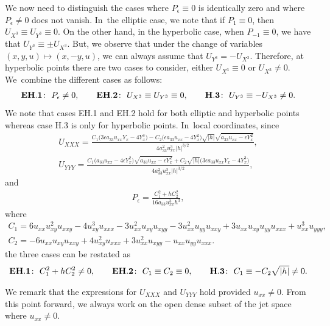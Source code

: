 \documentclass[10pt,a4paper]{amsart}
\numberwithin{equation}{section}
\begin{document}
We now need to distinguish the cases where $P_{\epsilon}\equiv 0$ is identically zero and where $P_{\epsilon}\neq 0$ does not vanish. In~the elliptic case, we note that if $P_1 \equiv 0$, then $U_{X^3}\equiv U_{Y^3}\equiv 0$. On the other hand, in the hyperbolic case, when $P_{-1} \equiv 0$, we have that $U_{Y^3} \equiv \pm U_{X^3}$. But, we observe that under the change of variables $(x,y,u)\mapsto (x,-y,u)$, we can always assume that $U_{Y^3}=-U_{X^3}$. Therefore, at hyperbolic points there are two cases to consider, either $U_{X^3} \equiv 0$ or $U_{X^3} \neq 0$. We~combine the different cases as follows:
\begin{gather*}
{\bf EH.1}\colon\ P_\epsilon \neq 0,\qquad
{\bf EH.2}\colon\ U_{X^3}\equiv U_{Y^3} \equiv 0,\qquad
{\bf H.3}\colon\ U_{Y^3} \equiv - U_{X^3}\neq 0.
\end{gather*}
We note that cases EH.1 and EH.2 hold for both elliptic and hyperbolic points whereas case H.3 is only for hyperbolic points. In~local coordinates, since
%
\begin{gather*}
U_{XXX} = \frac{C_1\big(3\epsilon a_{33} u_{xx}Y_x - 4Y_x^3\big)-C_2\big(\epsilon a_{33}u_{xx}-4 Y_x^2\big)\sqrt{|h|}\sqrt{a_{33}u_{xx} - \epsilon Y_x^2}}{4a_{33}^2u_{xx}^3 |h|^{3/2}},
\\[1ex]
U_{YYY} = \frac{C_1 \big(a_{33}u_{xx}-4\epsilon Y_x^2\big)\sqrt{a_{33}u_{xx}-\epsilon Y_x^2}+C_2\sqrt{|h|}\big(3\epsilon a_{33}u_{xx}Y_x - 4 Y_x^3\big)}{4a_{33}^2u_{xx}^3|h|^{3/2}},
\end{gather*}
%
and
\begin{gather*}
P_\epsilon = \frac{C_1^2 + hC_2^2}{16 a_{33}u_{xx}^3h^3},
\end{gather*}
where
%
\begin{gather*}%
C_1 = 6u_{xx}u_{xy}^2u_{xxy} - 4u_{xy}^3 u_{xxx} - 3u_{xx}^2u_{xy}u_{xyy}-3u_{xx}^2u_{yy}u_{xxy}+3u_{xx}u_{xy}u_{yy}u_{xxx}+u_{xx}^3u_{yyy},
\\
C_2 = -6u_{xx}u_{xy}u_{xxy}+4u_{xy}^2u_{xxx}+3u_{xx}^2u_{xyy}-u_{xx}u_{yy}u_{xxx}.
\end{gather*}
%
the three cases can be restated as
\begin{gather*}
{\bf EH.1}\colon\ C_1^2 + hC_2^2\neq 0,\qquad
{\bf EH.2}\colon\ C_1 \equiv C_2 \equiv 0,\qquad
{\bf H.3}\colon\ C_1 \equiv - C_2 \sqrt{|h|}\neq 0.
\end{gather*}

\begin{Remark}%
We remark that the expressions for $U_{XXX}$ and $U_{YYY}$ hold provided $u_{xx}\neq 0$. From this point forward, we always work on the open dense subset of the jet space where $u_{xx}\neq 0$.
\end{Remark}
\end{document}
